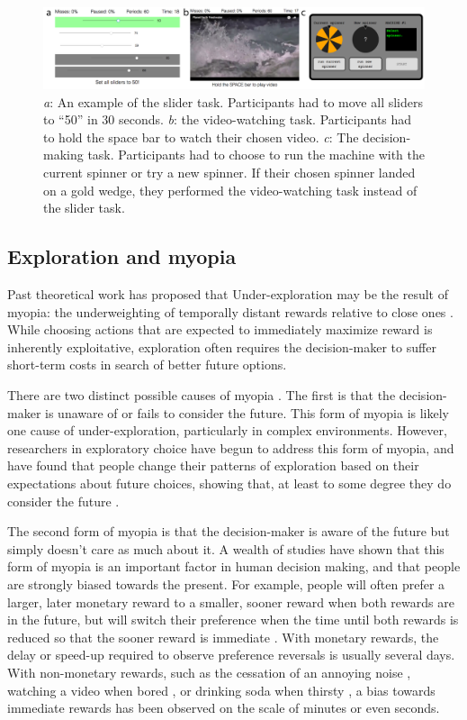 \documentclass[10pt,letterpaper]{article}
\begin{document}
\begin{figure}
\centering
\includegraphics[width=\textwidth]{figures/taskpictures.png}
\caption{\emph{a}: An example of the slider task. Participants had to move all
  sliders to ``50'' in 30 seconds. \emph{b}: the video-watching task.
  Participants had to hold the space bar to watch their chosen video. \emph{c}:
  The decision-making task. Participants had to choose to run the machine with
  the current spinner or try a new spinner. If their chosen spinner landed on
  a gold wedge, they performed the video-watching task instead of the
  slider task.}
\label{fig:taskpictures}
\end{figure}

\subsection{Exploration and myopia}

Past theoretical work has proposed that Under-exploration may be the result of myopia: the
underweighting of temporally distant rewards relative to close ones \citep{March1991, Levinthal1993}. 
While
choosing actions that are expected to immediately maximize reward is inherently
exploitative, exploration often requires the decision-maker to suffer short-term
costs in search of better future options.

There are two distinct possible causes of myopia \citep{Bartels2015}. The first is that the decision-maker is
unaware of or fails to consider the future. This form of myopia is likely one
cause of under-exploration, particularly in complex environments. However,
researchers in exploratory choice have begun to address this form of myopia, and
have found that people change their
patterns of exploration based on their expectations about future choices,
showing that, at least to some degree they do consider the future \citep{Meyer1995, Wilson2014a, Rich2017}.

The second form of myopia is that the decision-maker
is aware of the future but simply doesn't care as much about it.
A wealth of studies have shown that this form of myopia is an important factor
in human decision making, and that people are strongly
biased towards  the present. For example, people will often prefer a larger, later monetary
reward to a smaller, sooner reward when both rewards are in the future, but will
switch their preference when the time until both rewards is reduced so that the
sooner reward is immediate \citep{Kirby1995}. With monetary rewards, the delay
or speed-up required to observe preference reversals is usually several days. With non-monetary rewards,
such as the cessation of an annoying noise \citep{Solnick1980}, watching a video
when bored \citep{Navarick1998}, or drinking soda
when thirsty \citep{Brown2009}, a bias towards immediate rewards has been observed on the scale of
minutes or even seconds.
\end{document}
